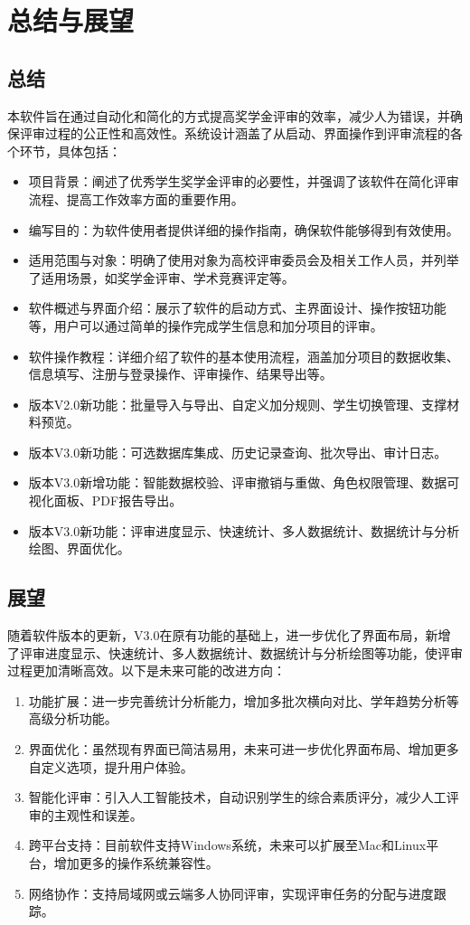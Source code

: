 \chapter{总结与展望}
\section{总结}
本软件旨在通过自动化和简化的方式提高奖学金评审的效率，减少人为错误，并确保评审过程的公正性和高效性。系统设计涵盖了从启动、界面操作到评审流程的各个环节，具体包括：

\begin{itemize}
	\item 	项目背景：阐述了优秀学生奖学金评审的必要性，并强调了该软件在简化评审流程、提高工作效率方面的重要作用。
	\item 	编写目的：为软件使用者提供详细的操作指南，确保软件能够得到有效使用。
	\item 	适用范围与对象：明确了使用对象为高校评审委员会及相关工作人员，并列举了适用场景，如奖学金评审、学术竞赛评定等。
	\item 	软件概述与界面介绍：展示了软件的启动方式、主界面设计、操作按钮功能等，用户可以通过简单的操作完成学生信息和加分项目的评审。
	\item 	软件操作教程：详细介绍了软件的基本使用流程，涵盖加分项目的数据收集、信息填写、注册与登录操作、评审操作、结果导出等。
	\item 	版本V2.0新功能：批量导入与导出、自定义加分规则、学生切换管理、支撑材料预览。
	\item 	版本V3.0新功能：可选数据库集成、历史记录查询、批次导出、审计日志。
	\item 	版本V3.0新增功能：智能数据校验、评审撤销与重做、角色权限管理、数据可视化面板、PDF报告导出。
	\item 	版本V3.0新功能：评审进度显示、快速统计、多人数据统计、数据统计与分析绘图、界面优化。
\end{itemize}
\section{展望}
随着软件版本的更新，V3.0在原有功能的基础上，进一步优化了界面布局，新增了评审进度显示、快速统计、多人数据统计、数据统计与分析绘图等功能，使评审过程更加清晰高效。以下是未来可能的改进方向：

\begin{enumerate}
	\item 	功能扩展：进一步完善统计分析能力，增加多批次横向对比、学年趋势分析等高级分析功能。
	\item 	界面优化：虽然现有界面已简洁易用，未来可进一步优化界面布局、增加更多自定义选项，提升用户体验。
	\item 	智能化评审：引入人工智能技术，自动识别学生的综合素质评分，减少人工评审的主观性和误差。
	\item 	跨平台支持：目前软件支持Windows系统，未来可以扩展至Mac和Linux平台，增加更多的操作系统兼容性。
	\item 	网络协作：支持局域网或云端多人协同评审，实现评审任务的分配与进度跟踪。
\end{enumerate}

